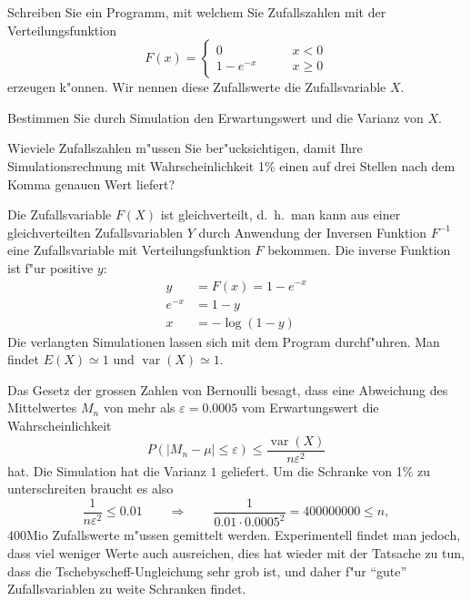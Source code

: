 Schreiben Sie ein Programm, mit welchem Sie Zufallszahlen mit der
Verteilungsfunktion
\[
F(x)=\begin{cases}
0&\qquad x< 0\\
1-e^{-x}&\qquad x\ge 0
\end{cases}
\]
erzeugen k"onnen. Wir nennen diese Zufallswerte die Zufallsvariable $X$.
\begin{teilaufgaben}
\item Bestimmen Sie durch Simulation den Erwartungswert und die Varianz
von $X$.
\item Wieviele Zufallszahlen m"ussen Sie ber"ucksichtigen, damit Ihre
Simulationsrechnung mit Wahrscheinlichkeit 1\% einen auf drei Stellen
nach dem Komma genauen Wert liefert?
\end{teilaufgaben}

\begin{loesung}
\begin{teilaufgaben}
\item Die Zufallsvariable $F(X)$ ist gleichverteilt, d.~h.~man kann aus
einer gleichverteilten Zufallsvariablen $Y$ durch Anwendung der Inversen
Funktion $F^{-1}$ eine Zufallsvariable mit Verteilungsfunktion $F$ bekommen.
Die inverse Funktion ist f"ur positive $y$:
\begin{align*}
y&=F(x)=1-e^{-x}\\
e^{-x}&=1-y\\
x&=-\log(1-y)
\end{align*}
Die verlangten Simulationen lassen sich mit dem Program
durchf"uhren. Man findet $E(X)\simeq 1$ und $\operatorname{var}(X)\simeq 1$.
\item
Das Gesetz der grossen Zahlen von Bernoulli besagt, dass 
eine Abweichung des Mittelwertes $M_n$ von mehr als $\varepsilon= 0.0005$
vom Erwartungswert die Wahrscheinlichkeit
\[
P(|M_n-\mu| \le \varepsilon)\le \frac{\operatorname{var}(X)}{n\varepsilon^2}
\]
hat. Die Simulation hat die Varianz $1$ geliefert.
Um die Schranke von 1\% zu unterschreiten braucht es also
\[
\frac1{n\varepsilon^2}\le 0.01
\qquad\Rightarrow\qquad
\frac1{0.01\cdot 0.0005^2}=400000000\le n,
\]
400Mio Zufallswerte m"ussen gemittelt werden. Experimentell findet man
jedoch, dass viel weniger Werte auch ausreichen, dies hat wieder mit der
Tatsache zu tun, dass die Tschebyscheff-Ungleichung sehr grob ist, und
daher f"ur ``gute'' Zufallsvariablen zu weite Schranken findet.
\end{teilaufgaben}
\end{loesung}

